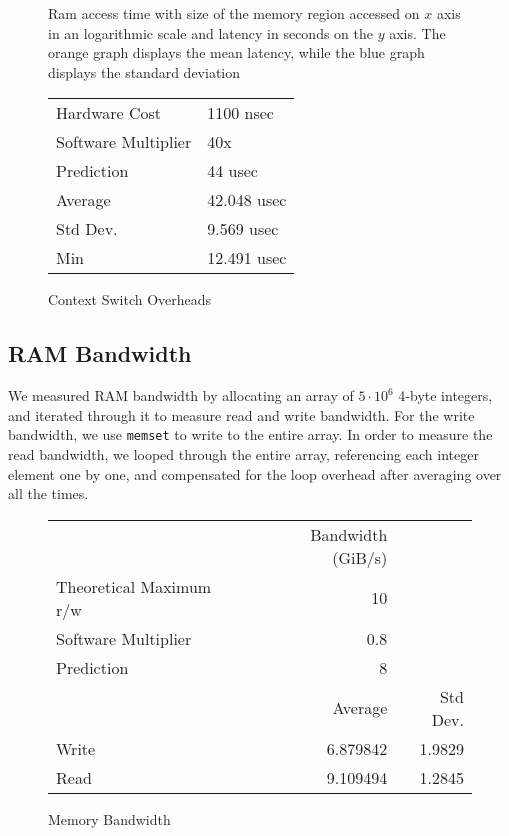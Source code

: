 \documentclass[letterpaper,twocolumn,10pt]{article}
\begin{document}
\begin{figure}
	\centering
	
	\caption{Ram access time with size of the memory region accessed on $x$  axis in an logarithmic scale and latency in seconds on the $y$ axis. The orange graph displays the mean latency, while the blue graph displays the standard deviation}
	\label{fig:memlatency}
\end{figure}

\begin{figure}
	\centering
\begin{tabular}{ll}
Hardware Cost  & 1100 nsec  \\
Software Multiplier  & 40x   \\
Prediction  & 44 usec    \\
Average  & 42.048 usec    \\
Std Dev. & 9.569 usec     \\
Min      & 12.491 usec   
\end{tabular}
\caption{Context Switch Overheads}
\label{tab:conswitchoverheads}
\end{figure}

\subsection{RAM Bandwidth}
We measured RAM bandwidth by allocating an array of $5 \cdot 10^6$ 4-byte
integers, and iterated through it to measure read and write bandwidth. For the
write bandwidth, we use \texttt{memset} to write to the entire array. In order
to measure the read bandwidth, we looped through the entire array, referencing
each integer element one by one, and compensated for the loop overhead after
averaging over all the times.

\begin{figure}
	\centering
    \begin{tabular}{l r r}
      & Bandwidth (GiB/s)\\
      Theoretical Maximum r/w & 10\\
      Software Multiplier & 0.8 \\
      Prediction & 8\\
                   & Average & Std Dev.\\
      Write & 6.879842 & 1.9829 \\
      Read & 9.109494 & 1.2845
\end{tabular}
\caption{Memory Bandwidth}
\label{tab:memorybandwidth}
\end{figure}
\end{document}
